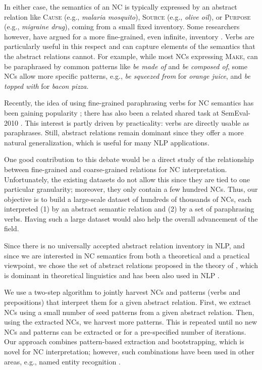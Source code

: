 \documentclass[letterpaper,11pt]{article}
\begin{document}
In either  case, the semantics of  an NC is typically  expressed by an
abstract relation like \textsc{Cause} (e.g., \emph{malaria mosquito}),
\textsc{Source} (e.g.,  \emph{olive oil}), or  \textsc{Purpose} (e.g.,
\emph{migraine  drug}),  coming from  a  small  fixed inventory.  Some
researchers
however, have argued for a more fine-grained, even infinite, inventory \cite{Finin:1980}.
Verbs are particularly useful in this respect and can capture elements
of the semantics that the abstract relations cannot.
For  example,   while  most  NCs  expressing   \textsc{Make},  can  be
paraphrased by common patterns like \textit{be made of} and \textit{be
composed of},  some NCs allow  more specific patterns,  e.g., \emph{be
squeezed from} for \emph{orange juice},  and \emph{be topped with} for
\textit{bacon pizza}.


Recently,    the    idea    of   using    fine-grained    paraphrasing
verbs    for    NC    semantics   has    been    gaining    popularity
\cite{Butnariu:2008,Nakov:2008:AIMSA}; there  has also been  a related
shared  task   at  SemEval-2010   \cite{SemEval:2010Paraphrase}.  This
interest is partly  driven by practicality: verbs  are directly usable
as paraphrases.  Still, abstract relations remain  dominant since they
offer  a more  natural generalization,  which is  useful for  many NLP
applications.

One good  contribution to this debate  would be a direct  study of the
relationship between fine-grained and  coarse-grained relations for NC
interpretation. Unfortunately, the existing  datasets do not allow this
since they are tied to one particular granularity; moreover, they only
contain  a  few  hundred  NCs.  Thus, our  objective  is  to  build  a
large-scale dataset of hundreds of thousands of NCs, each interpreted
(1) by an abstract semantic relation and
(2) by a set of paraphrasing verbs.
Having such a large dataset would also help the overall advancement of the field.

Since there is no universally  accepted abstract relation inventory in
NLP,  and  since  we  are  interested in  NC  semantics  from  both  a
theoretical and  a practical viewpoint,  we chose the set  of abstract
relations  proposed in  the  theory of  , which  is
dominant  in theoretical  linguistics and  has been  also used  in NLP
\cite{Nakov:2008}.

We use a two-step algorithm to jointly harvest NCs and patterns (verbs
and prepositions) that  interpret them for a  given abstract relation.
First, we  extract NCs using  a small number  of seed patterns  from a
given abstract  relation. Then,  using the  extracted NCs,  we harvest
more patterns. This  is repeated until no new NCs  and patterns can be
extracted or for a pre-specified number of iterations.
Our  approach  combines  pattern-based extraction  and  bootstrapping,
which is novel for NC  interpretation; however, such combinations have
been used in other areas, e.g., named entity recognition
\cite{Riloff:1999,Thelen:2002,Curran:2007,McIntosh:2009}.
\end{document}
